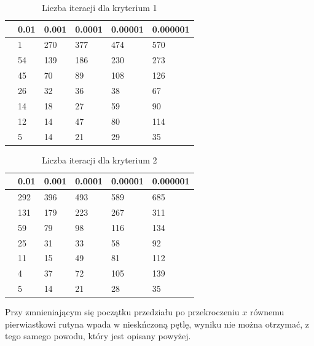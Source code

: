 \documentclass{article}
\begin{document}
\begin{table}[H]
\centering
\begin{tabular}{|l|l|l|l|l|l|}
\hline
& 0.01 & 0.001 & 0.0001 & 0.00001 & 0.000001 \\ \hline
[0.10, 1.90] & 1 & 270 & 377 & 474 & 570 \\ \hline
[0.20, 1.90] & 54 & 139 & 186 & 230 & 273 \\ \hline
[0.30, 1.90] & 45 & 70 & 89 & 108 & 126 \\ \hline
[0.40, 1.90] & 26 & 32 & 36 & 38 & 67 \\ \hline
[0.50, 1.90] & 14 & 18 & 27 & 59 & 90 \\ \hline
[0.60, 1.90] & 12 & 14 & 47 & 80 & 114 \\ \hline
[0.70, 1.90] & 5 & 14 & 21 & 29 & 35 \\ \hline
\end{tabular}
\caption{Liczba iteracji dla kryterium 1}
\end{table}

\begin{table}[H]
\centering
\begin{tabular}{|l|l|l|l|l|l|}
\hline
& 0.01 & 0.001 & 0.0001 & 0.00001 & 0.000001 \\ \hline
[0.10, 1.90] & 292 & 396 & 493 & 589 & 685 \\ \hline
[0.20, 1.90] & 131 & 179 & 223 & 267 & 311 \\ \hline
[0.30, 1.90] & 59 & 79 & 98 & 116 & 134 \\ \hline
[0.40, 1.90] & 25 & 31 & 33 & 58 & 92 \\ \hline
[0.50, 1.90] & 11 & 15 & 49 & 81 & 112 \\ \hline
[0.60, 1.90] & 4 & 37 & 72 & 105 & 139 \\ \hline
[0.70, 1.90] & 5 & 14 & 21 & 28 & 35 \\ \hline
\end{tabular}
\caption{Liczba iteracji dla kryterium 2}
\end{table}

Przy zmnieniającym się początku przedziału po przekroczeniu $x$ równemu pierwiastkowi rutyna wpada w nieskńczoną pętlę, 
wyniku nie można otrzymać, z tego samego powodu, który jest opisany powyżej.
\end{document}
